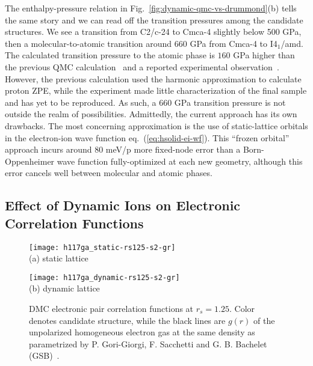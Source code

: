 The enthalpy-pressure relation in Fig.~\ref{fig:dynamic-qmc-vs-drummond}(b) tells the same story and we can read off the transition pressures among the candidate structures.
We see a transition from C2/c-24 to Cmca-4 slightly below 500 GPa, then a molecular-to-atomic transition around 660 GPa from Cmca-4 to I4$_1$/amd.
The calculated transition pressure to the atomic phase is $160$ GPa higher than the previous QMC calculation~\cite{McMinis2015} and a reported experimental observation~\cite{Silvera2017}.
However, the previous calculation used the harmonic approximation to calculate proton ZPE, while the experiment made little characterization of the final sample and has yet to be reproduced.
As such, a $660$ GPa transition pressure is not outside the realm of possibilities.
Admittedly, the current approach has its own drawbacks.
The most concerning approximation is the use of static-lattice orbitals in the electron-ion wave function eq.~(\ref{eq:hsolid-ei-wf}).
This ``frozen orbital'' approach incurs around $80$ meV/p more fixed-node error than a Born-Oppenheimer wave function fully-optimized at each new geometry, although this error cancels well between molecular and atomic phases.

\subsection{Effect of Dynamic Ions on Electronic Correlation Functions}

\begin{figure}[h]
	\centering
	\begin{minipage}{0.49\textwidth}
		\centering
		\texttt{[image: h117ga\_static-rs125-s2-gr]}\\
		(a) static lattice
	\end{minipage}
	\begin{minipage}{0.49\textwidth}
		\centering
		\texttt{[image: h117ga\_dynamic-rs125-s2-gr]}\\
		(b) dynamic lattice %
	\end{minipage}
	\caption{DMC electronic pair correlation functions at $r_s=1.25$. Color denotes candidate structure, while the black lines are $g(r)$ of the unpolarized homogeneous electron gas at the same density as parametrized by P. Gori-Giorgi, F. Sacchetti and G. B. Bachelet (GSB)~\cite{Gori-Giorgi2000}.}
	\label{fig:hsolid-eegr}
\end{figure}

